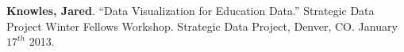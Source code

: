 \documentclass[margin,line]{res}
\newenvironment{list2}{
  \begin{list}{$\bullet$}{%
      \setlength{\itemsep}{0in}
      \setlength{\parsep}{0in} \setlength{\parskip}{0in}
      \setlength{\topsep}{0in} \setlength{\partopsep}{0in} 
      \setlength{\leftmargin}{0.2in}}}{\end{list}}
\begin{document}
\begin{resume}
\textbf{Knowles, Jared}. ``Data Visualization for Education Data.'' Strategic Data Project Winter Fellows Workshop. Strategic Data Project, Denver, CO. January $17^{th}$ 2013. 
% 
% 

% 



\end{resume}
\end{document}
